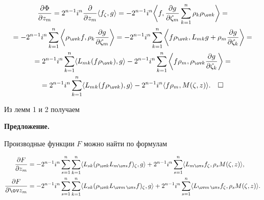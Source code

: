 \begin{multline*} 


\frac{\partial \Phi}{\partial z_m }=2^{n-1}i^n 


\frac{\partial }{\partial z_m}\la f_\zeta,g\ra=-2^{n-1}i^n\bigg\la 


f,\frac{\partial g}{\partial \zeta_m}\sum^n_{k=1}\rho_k\rho_{\ov k} 


\bigg\ra= \\ 


% 


=-2^{n-1}i^n\sum^n_{k=1}\bigg\la\rho_{\ov k}f,\rho_k 


\frac{\partial g}{\partial \zeta_m}\bigg\ra=-2^{n-1}i^n 


\sum^n_{k=1}\bigg\la f\rho_{\ov k},L_{mk}g+\rho_m 


\frac{\partial g}{\partial \zeta_k}\bigg\ra =\\ 


% 


=2^{n-1}i^n\sum^n_{k=1}\la L_{mk}(f\rho_{\ov k}),g\ra- 


2^{n-1}i^n\sum^n_{k=1}\bigg\la f\rho_m,\rho_{\ov k} 


\frac{\partial g}{\partial \zeta_k}\bigg\ra =\\ 


% 


=2^{n-1}i^n\sum^n_{k=1}\la L_{mk}(f\rho_{\ov k}),g\ra- 


2^{n-1}i^n\la f\rho_m,M(\zeta,z)\ra.\quad \square 


\end{multline*} 


 


Из лемм 1 и 2 получаем 


\medskip 


 


{\bf Предложение.} {\it 


Производные функции $F$ можно найти по формулам} 


\begin{align*} 


\frac{\partial F}{\partial z_m}&=-2^{n-1}i^n\sum^n_{s=1} 


\sum^n_{k=1}\la L_{sk}(\rho_{\ov k}L_{m\ov s}f)_\zeta,g\ra+ 


2^{n-1}i^n\sum^n_{s=1}\la L_{m\ov s}f_\zeta,\rho_s M(\zeta,z)\ra,\\ 


% 


\frac{\partial F}{\partial \ov z_m}&=-2^{n-1}i^n\sum^n_{s=1} 


\sum^n_{k=1}\la L_{sk}(\rho_{\ov k}L_{\ov m\,\ov s}f)_\zeta,g\ra+ 


2^{n-1}i^n\sum^n_{s=1}\la L_{\ov m\,\ov s}f_\zeta,\rho_s M(\zeta,z)\ra.


\end{align*} 


